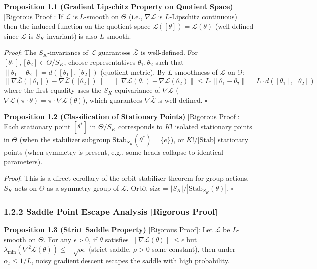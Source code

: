\documentclass[
  12pt,
]{article}
\begin{document}
\textbf{Proposition 1.1 (Gradient Lipschitz Property on Quotient Space)} [Rigorous Proof]: If $\mathcal{L}$ is $L$-smooth on $\Theta$ (i.e., $\nabla\mathcal{L}$ is $L$-Lipschitz continuous), then the induced function on the quotient space $\bar{\mathcal{L}}([\theta]) = \mathcal{L}(\theta)$ (well-defined since $\mathcal{L}$ is $S_K$-invariant) is also $L$-smooth.

\emph{Proof}: The $S_K$-invariance of $\mathcal{L}$ guarantees $\bar{\mathcal{L}}$ is well-defined. For $[\theta_1], [\theta_2] \in \Theta/S_K$, choose representatives $\theta_1, \theta_2$ such that $\|\theta_1 - \theta_2\| = d([\theta_1], [\theta_2])$ (quotient metric). By $L$-smoothness of $\mathcal{L}$ on $\Theta$:
\[\|\nabla\bar{\mathcal{L}}([\theta_1]) - \nabla\bar{\mathcal{L}}([\theta_2])\| = \|\nabla\mathcal{L}(\theta_1) - \nabla\mathcal{L}(\theta_2)\| \leq L \cdot \|\theta_1 - \theta_2\| = L \cdot d([\theta_1], [\theta_2])\]
where the first equality uses the $S_K$-equivariance of $\nabla\mathcal{L}$ ($\nabla\mathcal{L}(\pi \cdot \theta) = \pi \cdot \nabla\mathcal{L}(\theta)$), which guarantees $\nabla\bar{\mathcal{L}}$ is well-defined. $\square$

\textbf{Proposition 1.2 (Classification of Stationary Points)} [Rigorous Proof]: Each stationary point $[\theta^*]$ in $\Theta / S_K$ corresponds to $K!$ isolated stationary points in $\Theta$ (when the stabilizer subgroup $\text{Stab}_{S_K}(\theta^*) = \{e\}$), or $K! / |\text{Stab}|$ stationary points (when symmetry is present, e.g., some heads collapse to identical parameters).

\emph{Proof}: This is a direct corollary of the orbit-stabilizer theorem for group actions. $S_K$ acts on $\Theta$ as a symmetry group of $\mathcal{L}$. Orbit size = $|S_K| / |\text{Stab}_{S_K}(\theta)|$. $\square$

\subsubsection{1.2.2 Saddle Point Escape Analysis [Rigorous Proof]}\label{saddle-escape-analysis}

\textbf{Proposition 1.3 (Strict Saddle Property)} [Rigorous Proof]: Let $\mathcal{L}$ be $L$-smooth on $\Theta$. For any $\epsilon > 0$, if $\theta$ satisfies $\|\nabla\mathcal{L}(\theta)\| \leq \epsilon$ but $\lambda_{\min}(\nabla^2\mathcal{L}(\theta)) \leq -\sqrt{\rho\epsilon}$ (strict saddle, $\rho > 0$ some constant), then under $\alpha_t \leq 1/L$, noisy gradient descent escapes the saddle with high probability.
\end{document}

